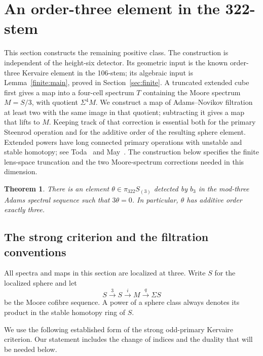 \documentclass[11pt]{article}
\newtheorem{theorem}{Theorem}[section]
\theoremstyle{definition}
\theoremstyle{remark}
\numberwithin{equation}{section}
\begin{document}
\section{An order-three element in the 322-stem}
\label{sec:cube}

This section constructs the remaining positive class.  The construction is
independent of the height-six detector.  Its geometric input is the known
order-three Kervaire element in the 106-stem; its algebraic input is
Lemma~\ref{finite:main}, proved in Section~\ref{sec:finite}.  A truncated
extended cube first gives a map into a four-cell spectrum \(T\) containing
the Moore spectrum \(M=S/3\), with quotient \(\Sigma^4M\).  We construct
a map of Adams--Novikov filtration at least two with the same image in
that quotient; subtracting it gives a map that lifts to \(M\).  Keeping
track of that correction is essential both for the primary Steenrod
operation and for the additive order of the resulting sphere element.
Extended powers have long connected primary operations with unstable
and stable homotopy; see Toda~\cite{TodaExtended} and
May~\cite[Sections~2--3]{MayOperations}.
The construction below specifies the finite lens-space truncation
and the two Moore-spectrum corrections needed in this dimension.

\begin{theorem}\label{cube:order-three}
There is an element \(\theta\in\pi_{322}S_{(3)}\) detected by \(b_3\) in the
mod-three Adams spectral sequence such that \(3\theta=0\).
In particular, \(\theta\) has additive order exactly three.
\end{theorem}

\subsection{The strong criterion and the filtration conventions}

All spectra and maps in this section are localized at three.  Write \(S\)
for the localized sphere and let
\begin{equation}\label{cube:moore-triangle}
 S\xrightarrow{3}S\xrightarrow{i}M\xrightarrow{q}\Sigma S
\end{equation}
be the Moore cofibre sequence.  A power of a sphere class always denotes
its product in the stable homotopy ring of \(S\).

We use the following established form of the strong odd-primary Kervaire
criterion.  Our statement includes the change of indices and the duality
that will be needed below.
\end{document}

